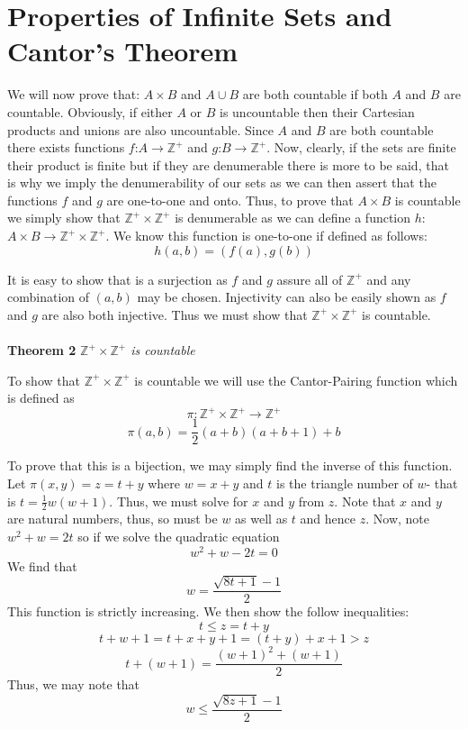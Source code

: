 \documentclass{article}
\begin{document}
\section{Properties of Infinite Sets and Cantor's Theorem}
\par We will now prove that: $A \times B$ and $A \cup B$ are both countable if both $A$ and $B$ are countable. Obviously, if either $A$ or $B$ is uncountable then their Cartesian products and unions are also uncountable. Since $A$ and $B$ are both countable there exists functions $f$:$A \to \mathbb{Z}^{+}$ and $g$:$B \to \mathbb{Z}^{+}$. Now, clearly, if the sets are finite their product is finite but if they are denumerable there is more to be said, that is why we imply the denumerability of our sets as we can then assert that the functions $f$ and $g$ are one-to-one and onto. Thus, to prove that $A \times B$ is countable we simply show that $\mathbb{Z}^{+} \times \mathbb{Z}^{+}$ is denumerable as we can define a function $h$:$A \times B \to \mathbb{Z}^{+} \times \mathbb{Z}^{+}$. We know this function is one-to-one if defined as follows: 
\[
h(a,b)=(f(a),g(b))
\]
\par It is easy to show that is a surjection as $f$ and $g$ assure all of $\mathbb{Z}^{+}$ and any combination of $(a,b)$ may be chosen. Injectivity can also be easily shown as $f$ and $g$ are also both injective. Thus we must show that $\mathbb{Z}^{+} \times \mathbb{Z}^{+}$ is countable.
\\
\\
\textbf{Theorem 2}
\textit{$\mathbb{Z}^{+} \times \mathbb{Z}^{+}$ is countable}
\par To show that $\mathbb{Z}^{+} \times \mathbb{Z}^{+}$ is countable we will use the Cantor-Pairing function which is defined as
\[
\pi: \mathbb{Z}^{+} \times \mathbb{Z}^{+} \to \mathbb{Z}^{+}
\]
\[
\pi(a,b)=\frac{1}{2}(a+b)(a+b+1)+b
\]
\par To prove that this is a bijection, we may simply find the inverse of this function.
Let $\pi(x,y)=z=t+y$ where $w=x+y$ and $t$ is the triangle number of $w$- that is $t=\frac{1}{2}w(w+1)$. Thus, we must solve for $x$ and $y$ from $z$. Note that $x$ and $y$ are natural numbers, thus, so must be $w$ as well as $t$ and hence $z$. Now, note $w^2+w=2t$ so if we solve the quadratic equation
\[
w^2+w-2t=0
\]
We find that 
\[
w=\frac{\sqrt{8t+1}-1}{2}
\] 
This function is strictly increasing. We then show the follow inequalities:
\[
t \leq z=t+y
\]
\[
t+w+1=t+x+y+1=(t+y)+x+1 > z
\]
\[
t+(w+1)=\frac{(w+1)^2+(w+1)}{2}
\]
Thus, we may note that 
\[
w \leq \frac{\sqrt{8z+1}-1}{2}
\]
\end{document}
